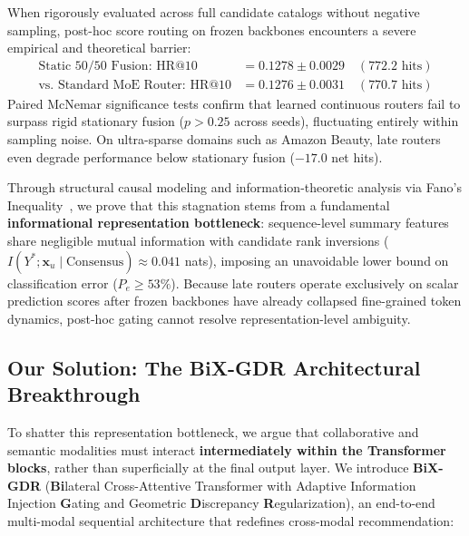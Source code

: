 When rigorously evaluated across full candidate catalogs without negative sampling, post-hoc score routing on frozen backbones encounters a severe empirical and theoretical barrier:
\begin{equation}
    \begin{aligned}
        \text{Static 50/50 Fusion: HR@10} &= 0.1278 \pm 0.0029 \quad (772.2 \text{ hits}) \\
        \text{vs. Standard MoE Router: HR@10} &= 0.1276 \pm 0.0031 \quad (770.7 \text{ hits})
    \end{aligned}
\end{equation}
Paired McNemar significance tests confirm that learned continuous routers fail to surpass rigid stationary fusion ($p > 0.25$ across seeds), fluctuating entirely within sampling noise. On ultra-sparse domains such as Amazon Beauty, late routers even degrade performance below stationary fusion ($-17.0$ net hits).

Through structural causal modeling and information-theoretic analysis via Fano's Inequality~\cite{fano1961transmission}, we prove that this stagnation stems from a fundamental \textbf{informational representation bottleneck}: sequence-level summary features share negligible mutual information with candidate rank inversions ($I(Y^* ; \mathbf{x}_u \mid \text{Consensus}) \approx 0.041$ nats), imposing an unavoidable lower bound on classification error ($P_e \ge 53\%$). Because late routers operate exclusively on scalar prediction scores after frozen backbones have already collapsed fine-grained token dynamics, post-hoc gating cannot resolve representation-level ambiguity.

\subsection{Our Solution: The BiX-GDR Architectural Breakthrough}
\label{sec:intro_solution}

To shatter this representation bottleneck, we argue that collaborative and semantic modalities must interact \textbf{intermediately within the Transformer blocks}, rather than superficially at the final output layer. We introduce \textbf{BiX-GDR} (\textbf{Bi}lateral Cross-Attentive Transformer with Adaptive Information Injection \textbf{G}ating and Geometric \textbf{D}iscrepancy \textbf{R}egularization), an end-to-end multi-modal sequential architecture that redefines cross-modal recommendation:

